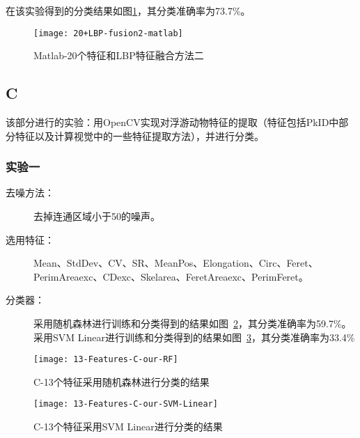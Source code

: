 在该实验得到的分类结果如图\ref{fig:20+LBP-fusion2-matlab}，其分类准确率为73.7\%。
\begin{figure}[!ht]
\centering
\texttt{[image: 20+LBP-fusion2-matlab]}
\caption{Matlab-20个特征和LBP特征融合方法二}
\label{fig:20+LBP-fusion2-matlab}
\end{figure}

\subsection{C}
该部分进行的实验：用OpenCV实现对浮游动物特征的提取（特征包括PkID中部分特征以及计算视觉中的一些特征提取方法），并进行分类。

\subsubsection{实验一}
\begin{description}
\item[去噪方法：] 去掉连通区域小于50的噪声。
\item[选用特征：] Mean、StdDev、CV、SR、MeanPos、Elongation、Circ、Feret、PerimAreaexc、CDexc、Skelarea、FeretAreaexc、PerimFeret。
\item[分类器：] 采用随机森林进行训练和分类得到的结果如图~\ref{fig:13-Features-C-our-RF}，其分类准确率为59.7\%。采用SVM Linear进行训练和分类得到的结果如图~\ref{fig:13-Features-C-our-SVM-Linear}，其分类准确率为33.4\%
\end{description}
\begin{figure}[!ht]
\centering
\texttt{[image: 13-Features-C-our-RF]}
\caption{C-13个特征采用随机森林进行分类的结果}
\label{fig:13-Features-C-our-RF}
\end{figure}

\begin{figure}[!ht]
\centering
\texttt{[image: 13-Features-C-our-SVM-Linear]}
\caption{C-13个特征采用SVM Linear进行分类的结果}
\label{fig:13-Features-C-our-SVM-Linear}
\end{figure}



